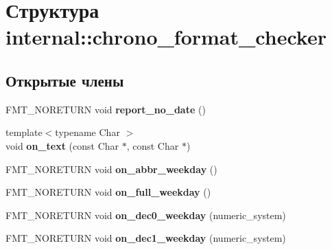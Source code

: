\hypertarget{structinternal_1_1chrono__format__checker}{}\section{Структура internal\+:\+:chrono\+\_\+format\+\_\+checker}
\label{structinternal_1_1chrono__format__checker}
\subsection*{Открытые члены}
\begin{DoxyCompactItemize}
\item 
\mbox{\label{structinternal_1_1chrono__format__checker_ac693f0e381059c698add617d3eb2112e}} 
F\+M\+T\+\_\+\+N\+O\+R\+E\+T\+U\+RN void {\bfseries report\+\_\+no\+\_\+date} ()
\item 
\mbox{\label{structinternal_1_1chrono__format__checker_a7fc729e71d1cc7060bd47d50e44eec09}} 
{\footnotesize template$<$typename Char $>$ }\\void {\bfseries on\+\_\+text} (const Char $\ast$, const Char $\ast$)
\item 
\mbox{\label{structinternal_1_1chrono__format__checker_a3958cdb7c77fcf5d7654a5ea0353baf5}} 
F\+M\+T\+\_\+\+N\+O\+R\+E\+T\+U\+RN void {\bfseries on\+\_\+abbr\+\_\+weekday} ()
\item 
\mbox{\label{structinternal_1_1chrono__format__checker_a1ce43ce10646ce785070c32d32331327}} 
F\+M\+T\+\_\+\+N\+O\+R\+E\+T\+U\+RN void {\bfseries on\+\_\+full\+\_\+weekday} ()
\item 
\mbox{\label{structinternal_1_1chrono__format__checker_aba7d94fb970ce6a3b9b0d29d29c3e1a6}} 
F\+M\+T\+\_\+\+N\+O\+R\+E\+T\+U\+RN void {\bfseries on\+\_\+dec0\+\_\+weekday} (numeric\+\_\+system)
\item 
\mbox{\label{structinternal_1_1chrono__format__checker_a05cef34d44b1eb398eb2012ef9c6e11c}} 
F\+M\+T\+\_\+\+N\+O\+R\+E\+T\+U\+RN void {\bfseries on\+\_\+dec1\+\_\+weekday} (numeric\+\_\+system)

\end{DoxyCompactItemize}

